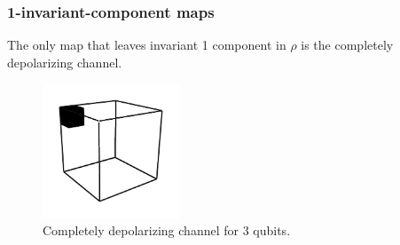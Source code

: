 \documentclass[11pt,dvipsnames]{article} %
\newcommand{\1}{\mathds{1}}
\begin{document}
\subsubsection*{1-invariant-component maps}
The only map that leaves invariant 1 component in $\rho$ is the completely
depolarizing channel.
\begin{figure}[H]
	\centering
	\includegraphics[height=4cm]{img/3q-1c}
	\caption{Completely depolarizing channel for 3 qubits.}
	\label{fig:QC-3q-1c}
\end{figure}
\end{document}

